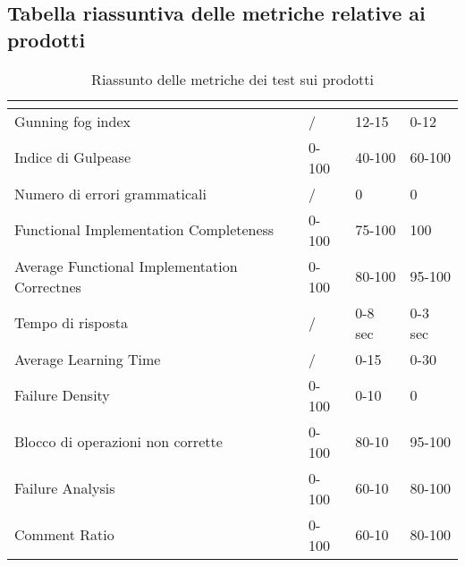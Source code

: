 \subsection{Tabella riassuntiva delle metriche relative ai prodotti}
\renewcommand{\arraystretch}{1.5}
\begin{table}[H]
	\centering
	\begin{tabular}{|C{4cm}|C{3cm}|C{3cm}|C{3cm}|}
		\hline
		\textbf{\color{title_text}{Nome Metrica}} & \textbf{\color{title_text}{Intervallo limite}} & \textbf{\color{title_text}{Range accettabile}} & \textbf{\color{title_text}{Range ottimale}} \\ \hline
		Gunning fog index & / &12-15&0-12 \\ \hline
		Indice di Gulpease & 0-100& 40-100& 60-100 \\ \hline
		Numero di errori grammaticali & / & 0 & 0 \\ \hline
		Functional Implementation Completeness & 0-100 & 75-100 & 100 \\ \hline
		Average Functional Implementation Correctnes&0-100&80-100&95-100 \\ \hline
		Tempo di risposta & / &0-8 sec & 0-3 sec \\ \hline
		Average Learning Time& / &0-15 & 0-30 \\ \hline
		Failure Density&0-100&0-10&0\\ \hline
		Blocco di operazioni non corrette &0-100&80-10&95-100\\ \hline
		Failure Analysis&0-100&60-10&80-100\\ \hline
		Comment Ratio&0-100&60-10&80-100\\ \hline
	\end{tabular}
	\caption{Riassunto delle metriche dei test sui prodotti}
	\label{tabella:riassunto metriche dei test sui prodotti}
\end{table}
\renewcommand{\arraystretch}{1}
\pagebreak